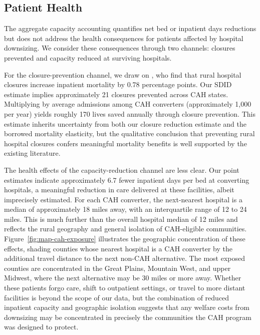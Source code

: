 \documentclass[a4paper, 12pt, twoside]{article}
\begin{document}
\subsection{Patient Health}
\label{sec:patient_health}

The aggregate capacity accounting quantifies net bed or inpatient days reductions but does not address the health consequences for patients affected by hospital downsizing. We consider these consequences through two channels: closures prevented and capacity reduced at surviving hospitals.

For the closure-prevention channel, we draw on \cite{gujral2019}, who find that rural hospital closures increase inpatient mortality by 0.78 percentage points. Our SDID estimate implies approximately 21 closures prevented across CAH states. Multiplying by average admissions among CAH converters (approximately 1,000 per year) yields roughly 170 lives saved annually through closure prevention. This estimate inherits uncertainty from both our closure reduction estimate and the borrowed mortality elasticity, but the qualitative conclusion that preventing rural hospital closures confers meaningful mortality benefits is well supported by the existing literature.

The health effects of the capacity-reduction channel are less clear. Our point estimates indicate approximately 6.7 fewer inpatient days per bed at converting hospitals, a meaningful reduction in care delivered at these facilities, albeit imprecisely estimated. For each CAH converter, the next-nearest hospital is a median of approximately 18 miles away, with an interquartile range of 12 to 24 miles. This is much further than the overall hospital median of 12 miles and reflects the rural geography and general isolation of CAH-eligible communities. Figure~\ref{fig:map-cah-exposure} illustrates the geographic concentration of these effects, shading counties whose nearest hospital is a CAH converter by the additional travel distance to the next non-CAH alternative. The most exposed counties are concentrated in the Great Plains, Mountain West, and upper Midwest, where the next alternative may be 30 miles or more away. Whether these patients forgo care, shift to outpatient settings, or travel to more distant facilities is beyond the scope of our data, but the combination of reduced inpatient capacity and geographic isolation suggests that any welfare costs from downsizing may be concentrated in precisely the communities the CAH program was designed to protect.
\end{document}
